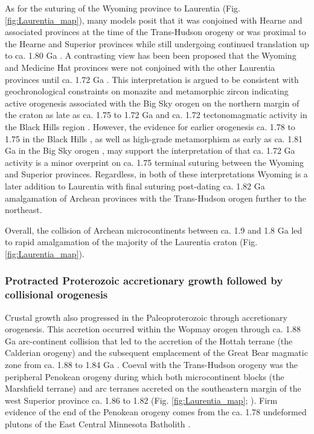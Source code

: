 \documentclass[twocolumn, switch]{article} %
\begin{document}
As for the suturing of the Wyoming province to Laurentia (Fig. \ref{fig:Laurentia_map}), many models posit that it was conjoined with Hearne and associated provinces at the time of the Trans-Hudson orogeny \citep[e.g.][]{St-Onge2009a, Pehrsson2015a} or was proximal to the Hearne and Superior provinces while still undergoing continued translation up to ca. 1.80 Ga \citep{Whitmeyer2007a}. A contrasting view has been been proposed that the Wyoming and Medicine Hat provinces were not conjoined with the other Laurentia provinces until ca. 1.72 Ga \citep{Kilian2016b}. This interpretation is argued to be consistent with geochronological constraints on monazite and metamorphic zircon indicating active orogenesis associated with the Big Sky orogen on the northern margin of the craton as late as ca. 1.75 to 1.72 Ga \citep{Condit2015a} and ca. 1.72 tectonomagmatic activity in the Black Hills region \citep{Redden1990a}. However, the evidence for earlier orogenesis ca. 1.78 to 1.75 in the Black Hills \citep{Dahl1999a, Hrncir2017a}, as well as high-grade metamorphism as early as ca. 1.81 Ga in the Big Sky orogen \citep{Condit2015a}, may support the interpretation of \citet{Hrncir2017a} that ca. 1.72 Ga activity is a minor overprint on ca. 1.75 terminal suturing between the Wyoming and Superior provinces. Regardless, in both of these interpretations Wyoming is a later addition to Laurentia with final suturing post-dating ca. 1.82 Ga amalgamation of Archean provinces with the Trans-Hudson orogen further to the northeast. 

Overall, the collision of Archean microcontinents between ca. 1.9 and 1.8 Ga led to rapid amalgamation of the majority of the Laurentia craton (Fig. \ref{fig:Laurentia_map}).

\subsubsection{Protracted Proterozoic accretionary growth followed by collisional orogenesis}

Crustal growth also progressed in the Paleoproterozoic through accretionary orogenesis. This accretion occurred within the Wopmay orogen through ca. 1.88 Ga arc-continent collision that led to the accretion of the Hottah terrane (the Calderian orogeny) and the subsequent emplacement of the Great Bear magmatic zone from ca. 1.88 to 1.84 Ga \citep{Hildebrand2009a}. Coeval with the Trans-Hudson orogeny was the peripheral Penokean orogeny during which both microcontinent blocks (the Marshfield terrane) and arc terranes accreted on the southeastern margin of the west Superior province ca. 1.86 to 1.82 (Fig. \ref{fig:Laurentia_map}; \citealp{Schulz2007a}). Firm evidence of the end of the Penokean orogeny comes from the ca. 1.78 undeformed plutons of the East Central Minnesota Batholith \citep{Holm2005a}.
\end{document}
